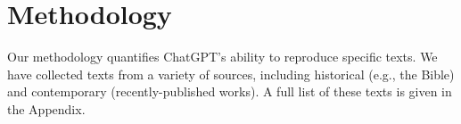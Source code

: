 \documentclass{article}
\begin{document}
\section{Methodology}
\label{sec:methodology}


Our methodology quantifies ChatGPT's ability to reproduce specific texts. We have collected texts from a variety of sources, including historical (e.g., the Bible) and contemporary (recently-published works). A full list of these texts is given in the Appendix.

\end{document}
